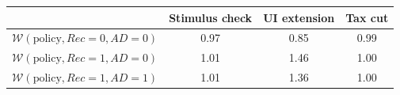 \begin{tabular}{@{}lccc@{}} 
\toprule 
                          & Stimulus check      & UI extension    & Tax cut    \\  \midrule 
$\mathcal{W}(\text{policy}, Rec=0, AD=0)$ & 0.97  & 0.85  & 0.99     \\ 
$\mathcal{W}(\text{policy}, Rec=1, AD=0)$ & 1.01  & 1.46  & 1.00     \\ 
$\mathcal{W}(\text{policy}, Rec=1, AD=1)$ & 1.01  & 1.36  & 1.00     \\ \bottomrule 
\end{tabular}  
